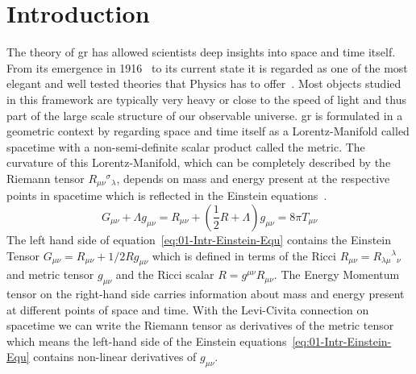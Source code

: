 \section{Introduction}
\label{sec:01-Introduction}
The theory of \ac{gr} has allowed scientists deep insights into space and time itself.
From its emergence in 1916~\cite{einsteinGrundlageAllgemeinenRelativitaetstheorie1916a} to its current state it is regarded as one of the most elegant and well tested theories that Physics has to offer~\cite{hafeleAroundtheWorldAtomicClocks1972, vessotTestRelativisticGravitation1980a, battatApachePointObservatory2009}.
Most objects studied in this framework are typically very heavy or close to the speed of light and thus part of the large scale structure of our observable universe.
\ac{gr} is formulated in a geometric context by regarding space and time itself as a Lorentz-Manifold called spacetime with a non-semi-definite scalar product called the metric.
The curvature of this Lorentz-Manifold, which can be completely described by the Riemann tensor $R_{\mu \nu}{ }^{\sigma}{ }_{\lambda}$, depends on mass and energy present at the respective points in spacetime which is reflected in the Einstein equations~\cite{einsteinFeldgleichungenGravitation1915}.
\begin{equation}
	G_{\mu\nu}+\Lambda g_{\mu\nu} = R_{\mu\nu} + \left(\frac{1}{2}R+\Lambda\right)g_{\mu\nu}=8\pi T_{\mu\nu}
	\label{eq:01-Intr-Einstein-Equ}
\end{equation}
The left hand side of equation~\ref{eq:01-Intr-Einstein-Equ} contains the Einstein Tensor $G_{\mu\nu}=R_{\mu\nu}+1/2Rg_{\mu\nu}$ which is defined in terms of the Ricci $R_{\mu \nu}=R_{\lambda\mu}{}^{\lambda}{}_\nu$ and metric tensor $g_{\mu\nu}$ and the Ricci scalar $R=g^{\mu\nu}R_{\mu\nu}$.
The Energy Momentum tensor on the right-hand side carries information about mass and energy present at different points of space and time.
With the Levi-Civita connection on spacetime we can write the Riemann tensor as derivatives of the metric tensor which means the left-hand side of the Einstein equations~\ref{eq:01-Intr-Einstein-Equ} contains non-linear derivatives of $g_{\mu\nu}$.
